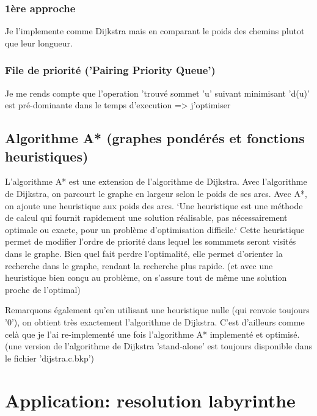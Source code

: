 \documentclass[a4paper,10pt]{article}
\begin{document}
    \subsubsection{1ère approche}
      Je l'implemente comme Dijkstra mais en comparant le poids des chemins plutot que leur longueur.
    \subsubsection{File de priorité ('Pairing Priority Queue')}
      Je me rends compte que l'operation 'trouvé sommet 'u' suivant minimisant 'd(u)' est pré-dominante dans le temps d'execution => j'optimiser
  \newpage
  \subsection{Algorithme A* (graphes pondérés et fonctions heuristiques)}
    L'algorithme A* est une extension de l'algorithme de Dijkstra.\newline
    Avec l'algorithme de Dijkstra, on parcourt le graphe en largeur selon le poids de ses arcs.
    Avec A*, on ajoute une heuristique aux poids des arcs.\newline
    `Une heuristique est une méthode de calcul qui fournit rapidement une solution réalisable,
    pas nécessairement optimale ou exacte, pour un problème d'optimisation difficile.`\newline
    Cette heuristique permet de modifier l'ordre de priorité dans lequel les sommmets seront visités dans le graphe.
    Bien quel fait perdre l'optimalité, elle permet d'orienter la recherche dans le graphe, rendant la recherche plus rapide.
    (et avec une heuristique bien conçu au problème, on s'assure tout de même une solution proche de l'optimal)\newline\newline
    
    Remarquons également qu'en utilisant une heuristique nulle (qui renvoie toujours '0'), on obtient très exactement l'algorithme de Dijkstra.
    C'est d'ailleurs comme celà que je l'ai re-implementé une fois l'algorithme A* implementé et optimisé.\newline
    (une version de l'algorithme de Dijkstra 'stand-alone' est toujours disponible dans le fichier 'dijstra.c.bkp')
  \newpage
  \section{Application: resolution labyrinthe}
  
\end{document}
